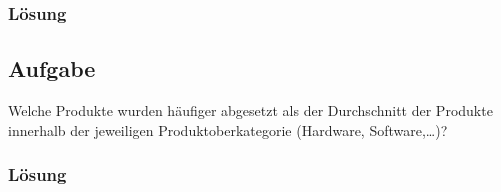 \subsubsection*{Lösung}
\label{subsubsec:uebung_07.aufgabe_05.loesung}


\label{subsec:uebung_07.aufgabe_06}
\subsection{Aufgabe}
Welche Produkte wurden häufiger abgesetzt als der Durchschnitt der Produkte innerhalb der jeweiligen Produktoberkategorie (Hardware, Software,…)?

\subsubsection*{Lösung}
\label{subsubsec:uebung_07.aufgabe_06.loesung}
